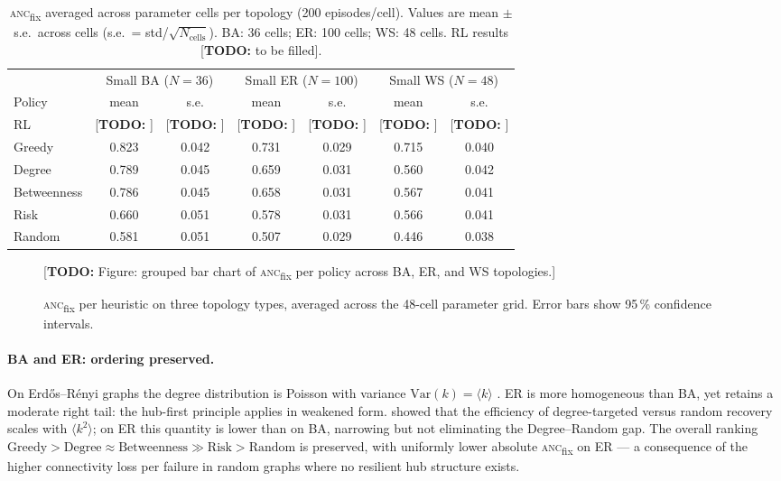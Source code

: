 \documentclass[11pt]{article}
\newcommand{\anc}{\textsc{anc}}
\newcommand{\ancfix}{\anc{}\textsubscript{fix}}
\newcommand{\todo}[1]{\textcolor{red!70!black}{[\textbf{TODO:} #1]}}
\begin{document}
\begin{table}[htbp]
\centering
\caption{\ancfix{} averaged across parameter cells per topology
         (200 episodes/cell).
         Values are mean $\pm$ s.e.\ across cells (s.e.\ = std/$\sqrt{N_{\mathrm{cells}}}$).
         BA: 36 cells; ER: 100 cells; WS: 48 cells.
         RL results \todo{to be filled}.}
\label{tab:topology_comparison}
\setlength{\tabcolsep}{5pt}
\begin{tabular}{l cc cc cc}
\toprule
 & \multicolumn{2}{c}{Small BA ($N=36$)}
 & \multicolumn{2}{c}{Small ER ($N=100$)}
 & \multicolumn{2}{c}{Small WS ($N=48$)} \\
\cmidrule(lr){2-3}\cmidrule(lr){4-5}\cmidrule(lr){6-7}
Policy      & mean   & s.e.   & mean   & s.e.   & mean   & s.e.   \\
\midrule
RL          & \todo{} & \todo{} & \todo{} & \todo{} & \todo{} & \todo{} \\
Greedy      & 0.823  & 0.042  & 0.731  & 0.029  & 0.715  & 0.040  \\
Degree      & 0.789  & 0.045  & 0.659  & 0.031  & 0.560  & 0.042  \\
Betweenness & 0.786  & 0.045  & 0.658  & 0.031  & 0.567  & 0.041  \\
Risk        & 0.660  & 0.051  & 0.578  & 0.031  & 0.566  & 0.041  \\
Random      & 0.581  & 0.051  & 0.507  & 0.029  & 0.446  & 0.038  \\
\bottomrule
\end{tabular}
\end{table}

\begin{figure}[htbp]
\centering
\todo{Figure: grouped bar chart of \ancfix{} per policy across BA, ER,
and WS topologies.}
\caption{\ancfix{} per heuristic on three topology types, averaged across
         the 48-cell parameter grid.
         Error bars show 95\,\% confidence intervals.}
\label{fig:topo_heuristic}
\end{figure}

\paragraph{BA and ER: ordering preserved.}
On Erd\H{o}s--R\'enyi graphs the degree distribution is Poisson with
variance $\mathrm{Var}(k) = \langle k\rangle$ \citep{erdos1960evolution}.
ER is more homogeneous than BA, yet retains a moderate right tail:
the hub-first principle applies in weakened form.
\citet{callaway2000network} showed that the efficiency of degree-targeted
versus random recovery scales with $\langle k^2\rangle$; on ER this
quantity is lower than on BA, narrowing but not eliminating the
Degree--Random gap.
The overall ranking $\text{Greedy} > \text{Degree} \approx
\text{Betweenness} \gg \text{Risk} > \text{Random}$ is preserved,
with uniformly lower absolute \ancfix{} on ER — a consequence of the
higher connectivity loss per failure in random graphs where no resilient
hub structure exists.
\end{document}
